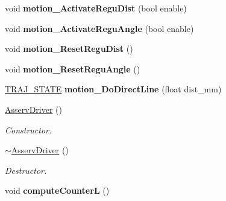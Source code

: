 \begin{DoxyCompactItemize}
\item 
\mbox{\label{classAsservDriver_a48e4f69bf857d6a18098dc48615a61f1}} 
void {\bfseries motion\+\_\+\+Activate\+Regu\+Dist} (bool enable)
\item 
\mbox{\label{classAsservDriver_a846608b8033f7d592d2540b68de72eeb}} 
void {\bfseries motion\+\_\+\+Activate\+Regu\+Angle} (bool enable)
\item 
\mbox{\label{classAsservDriver_acb84d282c7e0b40d9b326b0fcb7a0c69}} 
void {\bfseries motion\+\_\+\+Reset\+Regu\+Dist} ()
\item 
\mbox{\label{classAsservDriver_acd102376cacdf0fc40a587f25359a25e}} 
void {\bfseries motion\+\_\+\+Reset\+Regu\+Angle} ()
\item 
\mbox{\label{classAsservDriver_a9d967bff5061c791226484bbd998362b}} 
\hyperlink{path__manager_8h_adb3360abeb29758da93865c8afcb80eb}{T\+R\+A\+J\+\_\+\+S\+T\+A\+TE} {\bfseries motion\+\_\+\+Do\+Direct\+Line} (float dist\+\_\+mm)
\item 
\mbox{\label{classAsservDriver_a70982198e21af96e5d4faa6ce9b0608c}} 
\hyperlink{classAsservDriver_a70982198e21af96e5d4faa6ce9b0608c}{Asserv\+Driver} ()
\begin{DoxyCompactList}\small\item\em Constructor. \end{DoxyCompactList}\item 
\mbox{\label{classAsservDriver_a5960b3ced1e727d33ded6ff469fc1a78}} 
\hyperlink{classAsservDriver_a5960b3ced1e727d33ded6ff469fc1a78}{$\sim$\+Asserv\+Driver} ()
\begin{DoxyCompactList}\small\item\em Destructor. \end{DoxyCompactList}\item 
\mbox{\label{classAsservDriver_a8b02e6ec0a124ca9178f17c829d48513}} 
void {\bfseries compute\+CounterL} ()
\item 
\mbox{\label{classAsservDriver_af852b42fef0dbd773141d5e5fd0a74f6}} 

\end{DoxyCompactItemize}
